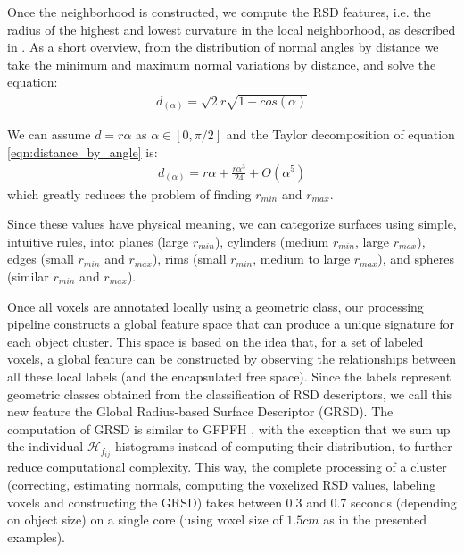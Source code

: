 \documentclass[conference]{sty/IEEEtran}
\def\cH{\mathcal{H}}
\begin{document}
Once the neighborhood is constructed, we compute the RSD features, i.e. the
radius of the highest and lowest curvature in the local neighborhood, as
described in \cite{Marton10IROS}. As a short overview, from the distribution
of normal angles by distance we take the minimum and maximum normal
variations by distance, and solve the equation:
\begin{align}
\label{eqn:distance_by_angle}
  d_{(\alpha)} = \sqrt{2} r \sqrt{1 - cos(\alpha)}
\end{align}

We can assume $d = r \alpha$ as $\alpha \in [0,\pi/2]$ and the Taylor
decomposition of equation \ref{eqn:distance_by_angle} is:
\begin{align}
\label{eqn:taylor}
  d_{(\alpha)} = r \alpha + \frac{r \alpha^3}{24} + O(\alpha^5)
\end{align}
which greatly reduces the problem of finding $r_{min}$ and $r_{max}$.

Since these values have physical meaning, we can categorize surfaces using
simple, intuitive rules, into: planes (large $r_{min}$), cylinders (medium $r_{min}$,
large $r_{max}$), edges (small $r_{min}$ and $r_{max}$), rims (small $r_{min}$,
medium to large $r_{max}$), and spheres (similar $r_{min}$ and $r_{max}$).

Once all voxels are annotated locally using a geometric class, our
processing pipeline constructs a global feature space that can
produce a unique signature for each object cluster.  This space is
based on the idea that, for a set of labeled voxels, a
global feature can be constructed by observing the relationships between all
these local labels (and the encapsulated free space).
Since the labels represent geometric classes obtained
from the classification of RSD descriptors, we call this new feature the
Global Radius-based Surface Descriptor (GRSD).
The computation of GRSD is similar to GFPFH \cite{Rusu09ICCV-WS}, with the
exception that we sum up the individual $\cH_{f_{ij}}$ histograms instead of
computing their distribution, to further reduce computational complexity. This way,
the complete processing of a cluster (correcting, estimating normals,
computing the voxelized RSD values, labeling voxels and constructing the
GRSD) takes between 0.3 and 0.7 seconds (depending on object size) on a
single core (using voxel size of $1.5cm$ as in the presented examples).
\end{document}
